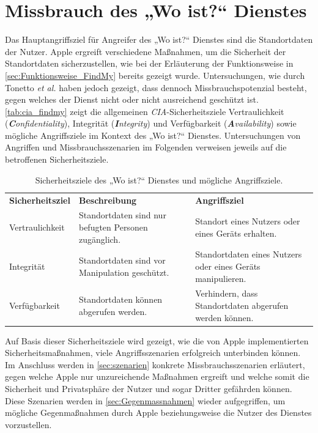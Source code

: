 \section{Missbrauch des „Wo ist?“ Dienstes}
\label{sec:Missbrauch}

Das Hauptangriffsziel für Angreifer des „Wo ist?“ Dienstes sind die Standortdaten der Nutzer.
Apple ergreift verschiedene Maßnahmen, um die Sicherheit der Standortdaten sicherzustellen, wie bei der Erläuterung der Funktionsweise in \autoref{sec:Funktionsweise_FindMy} bereits gezeigt wurde.
Untersuchungen, wie durch Tonetto \textit{et al.} \cite{Tonetto_FindMy} haben jedoch gezeigt, dass dennoch Missbrauchspotenzial besteht, gegen welches der Dienst nicht oder nicht ausreichend geschützt ist.
\autoref{tab:cia_findmy} zeigt die allgemeinen \textit{CIA}-Sicherheitsziele Vertraulichkeit (\textit{\textbf{C}onfidentiality}), Integrität (\textit{\textbf{I}ntegrity}) und Verfügbarkeit (\textit{\textbf{A}vailability}) sowie mögliche Angriffsziele im Kontext des „Wo ist?“ Dienstes.
Untersuchungen von Angriffen und Missbrauchsszenarien im Folgenden verweisen jeweils auf die betroffenen Sicherheitsziele.

\begin{table}[ht]
  \caption{Sicherheitsziele des „Wo ist?“ Dienstes und mögliche Angriffsziele.}
  \label{tab:cia_findmy}
  \begin{tabularx}{\textwidth}{ |l|X|X| }
    \hline
    \textbf{Sicherheitsziel}  & \textbf{Beschreibung}                                               & \textbf{Angriffsziel}                                           \\
    \Xhline{0.5mm}
    \hline
    Vertraulichkeit           & Standortdaten sind nur befugten Personen zugänglich.                & Standort eines Nutzers oder eines Geräts erhalten.              \\
    \hline
    Integrität                & Standortdaten sind vor Manipulation geschützt.                      & Standortdaten eines Nutzers oder eines Geräts manipulieren.     \\
    \hline
    Verfügbarkeit             & Standortdaten können abgerufen werden.                              & Verhindern, dass Standortdaten abgerufen werden können.         \\
    \hline
  \end{tabularx}
\end{table}
Auf Basis dieser Sicherheitsziele wird gezeigt, wie die von Apple implementierten Sicherheitsmaßnahmen, viele Angriffsszenarien erfolgreich unterbinden können.
Im Anschluss werden in \autoref{sec:szenarien} konkrete Missbrauchsszenarien erläutert, gegen welche Apple nur unzureichende Maßnahmen ergreift und welche somit die Sicherheit und Privatsphäre der Nutzer und sogar Dritter gefährden können.
Diese Szenarien werden in \autoref{sec:Gegenmassnahmen} wieder aufgegriffen, um mögliche Gegenmaßnahmen durch Apple beziehungsweise die Nutzer des Dienstes vorzustellen.

